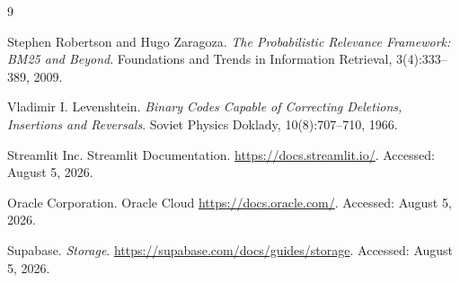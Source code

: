 \documentclass[10pt,a4paper]{article}
\begin{document}
\newpage
\begin{thebibliography}{9}

Stephen Robertson and Hugo Zaragoza.
\textit{The Probabilistic Relevance Framework: BM25 and Beyond}.
Foundations and Trends in Information Retrieval,
3(4):333--389, 2009.

Vladimir I. Levenshtein.
\textit{Binary Codes Capable of Correcting Deletions, Insertions and Reversals}.
Soviet Physics Doklady,
10(8):707--710, 1966.

Streamlit Inc.
Streamlit Documentation.
\url{https://docs.streamlit.io/}.
Accessed: August 5, 2026.

Oracle Corporation.
Oracle Cloud
\url{https://docs.oracle.com/}.
Accessed: August 5, 2026.

Supabase.
\textit{Storage}.
\url{https://supabase.com/docs/guides/storage}.
Accessed: August 5, 2026.

\end{thebibliography}
\end{document}
